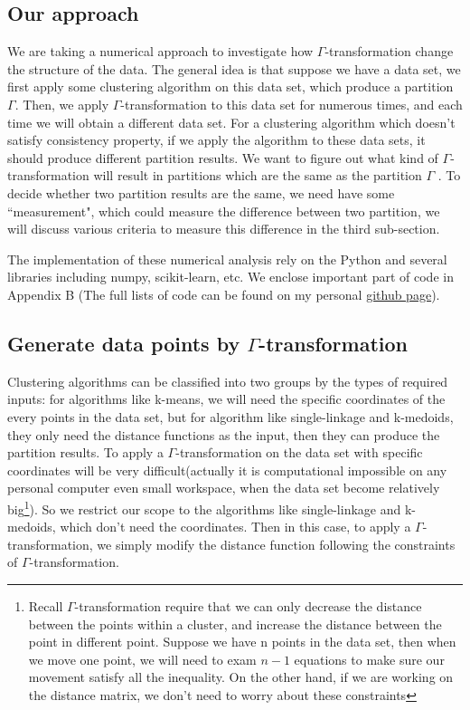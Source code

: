 \documentclass{uonmathreport}
\begin{document}
\subsection{Our approach} \label{subsec:approach}
We are taking a numerical approach to investigate how $\Gamma$-transformation change the structure of the data. The general idea is that suppose we have a data set, we first apply some clustering algorithm on this data set, which produce a partition $\Gamma$. Then, we apply $\Gamma$-transformation to this data set for numerous times, and each time we will obtain a different data set. For a clustering algorithm which doesn't satisfy consistency property, if we apply the algorithm to these data sets, it should produce different partition results. We want to figure out what kind of $\Gamma$-transformation will result in partitions which are the same as the partition $\Gamma$ . To decide whether two partition results are the same, we need have some ``measurement", which could measure the difference between two partition, we will discuss various criteria to measure this difference in the third sub-section.

The implementation of these numerical analysis rely on the Python and several libraries including numpy, scikit-learn, etc. We enclose important part of code in Appendix B (The full lists of code can be found on my personal  \href{https://github.com/Zehui127/clusteringResearch2019}{github page}).

\subsection{Generate data points by $\Gamma$-transformation} \label{subsec:blue}
Clustering algorithms can be classified into two groups by the types of required inputs: for algorithms like k-means, we will need the specific coordinates of the every points in the data set, but for algorithm like single-linkage and k-medoids, they only need the distance functions as the input, then they can produce the partition results. To apply a $\Gamma$-transformation on the data set with specific coordinates will be very difficult(actually it is computational impossible on any personal computer even small workspace, when the data set become relatively big\footnote{Recall $\Gamma$-transformation require that we can only decrease the distance between the points within a cluster, and increase the distance between the point in different point. Suppose we have n points in the data set, then when we move one point, we will need to exam $n-1$ equations to make sure our movement satisfy all the inequality. On the other hand, if we are working on the distance matrix, we don't need to worry about these constraints}). So we restrict our scope to the algorithms like single-linkage and k-medoids, which don't need the coordinates. Then in this case, to apply a $\Gamma$-transformation, we simply modify the distance function following the constraints of $\Gamma$-transformation.
\end{document}

